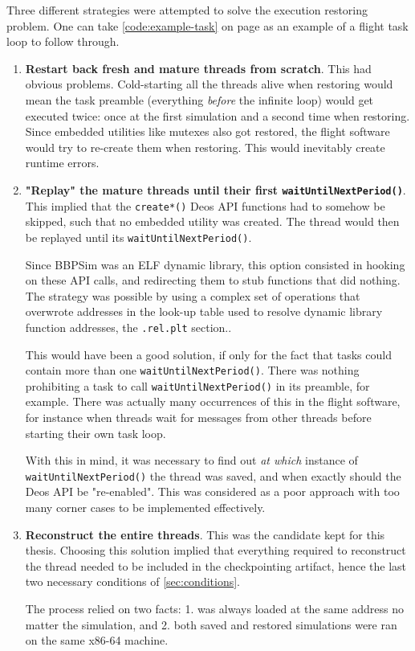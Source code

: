 Three different strategies were attempted to solve the execution restoring problem. One can take \autoref{code:example-task} on page \pageref{code:example-task} as an example of a flight task loop to follow through.
\begin{enumerate}
	\item \textbf{Restart back fresh and mature threads from scratch}. This had obvious problems.  Cold-starting all the threads alive when restoring would mean the task preamble (everything \textit{before} the infinite loop) would get executed twice: once at the first simulation and a second time when restoring. Since embedded utilities like mutexes also got restored, the flight software would try to re-create them when restoring. This would inevitably create runtime errors.
	
	\item \textbf{"Replay" the mature threads until their first \texttt{waitUntilNextPeriod()}}. This implied that the \texttt{create*()} Deos API functions had to somehow be skipped, such that no embedded utility was created. The thread would then be replayed until its \texttt{waitUntilNextPeriod()}.
	
	Since \gls{BBPSim} was an \gls{ELF} dynamic library, this option consisted in hooking on these API calls, and redirecting them to stub functions that did nothing. The strategy was possible by using a complex set of operations that overwrote addresses in the look-up table used to resolve dynamic library function addresses, the \texttt{.rel.plt} section.\cite{online:shoumikhin}.
	
	This would have been a good solution, if only for the fact that tasks could contain more than one \texttt{waitUntilNextPeriod()}. There was nothing prohibiting a task to call \texttt{waitUntilNextPeriod()} in its preamble, for example. There was actually many occurrences of this in the flight software, for instance when threads wait for messages from other threads before starting their own task loop.
	
	With this in mind, it was necessary to find out \textit{at which} instance of \texttt{waitUntilNextPeriod()} the thread was saved, and when exactly should the Deos API be "re-enabled". This was considered as a poor approach with too many corner cases to be implemented effectively.
	
	\item \textbf{Reconstruct the entire threads}. This was the candidate kept for this thesis. Choosing this solution implied that everything required to reconstruct the thread needed to be included in the checkpointing artifact, hence the last two necessary conditions of \autoref{sec:conditions}. 
	
	The process relied on two facts: 1.  was always loaded at the same address no matter the simulation, and 2. both saved and restored simulations were ran on the same x86-64 machine. 
\end{enumerate}


